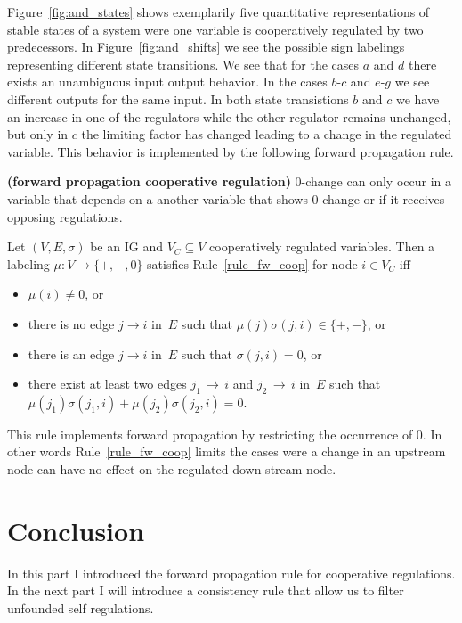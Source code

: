 Figure~\ref{fig:and_states} shows exemplarily five quantitative representations of stable states of 
 a system were one variable is cooperatively regulated by two predecessors.
In Figure~\ref{fig:and_shifts} we see the possible sign labelings representing different state transitions.
%
We see that for the cases $a$ and $d$ there exists an unambiguous input output behavior.
In the cases $b$-$c$ and $e$-$g$ we see different outputs for the same input.
In both state transistions $b$ and $c$ we have an increase in one of the regulators while the other regulator remains unchanged,
 but only in $c$ the limiting factor has changed leading to a change in the regulated variable.
This behavior is implemented by the following forward propagation rule.
%
\begin{srule}\label{rule_fw_coop}{\bf (forward propagation cooperative regulation)} 0-change can only occur in a variable that depends on a another variable that shows 0-change
 or if it receives opposing regulations.

Let $(V,E,\sigma)$ be an IG and $V_C \subseteq V$ cooperatively regulated variables.
Then a labeling $\mu : V \rightarrow \{\plus,\minus,0\}$ satisfies Rule~\ref{rule_fw_coop} for node $i \in V_C$
 iff
 \begin{itemize}
  \item $\mu(i) \neq 0$, or
  \item there is no edge $j \rightarrow i$ in~$E$ such that $\mu(j)\sigma(j,i) \in \{\plus,\minus\}$, or
  \item there is an edge $j \rightarrow i$ in~$E$ such that $\sigma(j,i)= 0$, or
  \item there exist at least two edges $j_1 {\,\rightarrow\,} i$ and $j_2 {\,\rightarrow\,} i$ in~$E$
 such that $\mu(j_1)\sigma(j_1,i) + \mu(j_2)\sigma(j_2,i) = 0$. 
 \end{itemize}
\end{srule}
This rule implements forward propagation by restricting the occurrence of $0$.
In other words Rule~\ref{rule_fw_coop} limits the cases were a change in an upstream node can have no effect
 on the regulated down stream node.

\section*{Conclusion} 

In this part I introduced the forward propagation rule for cooperative regulations.
In the next part I will introduce a consistency rule that allow us to filter unfounded self regulations.